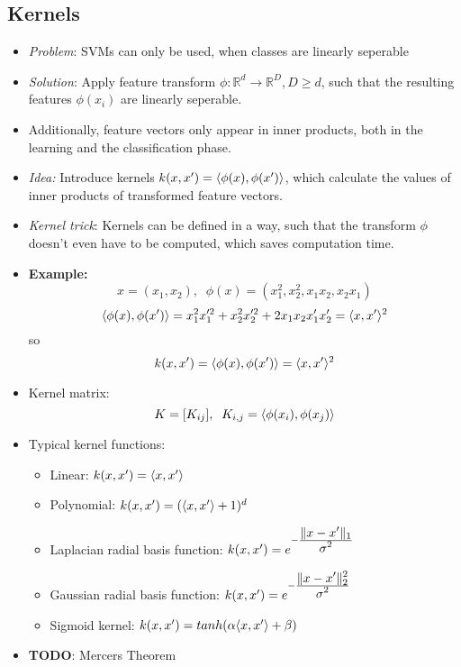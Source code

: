 \subsection*{Kernels}
\begin{itemize}
    \item
        \textit{Problem}: SVMs can only be used, when classes are linearly seperable
    \item
        \textit{Solution}: Apply feature transform $\phi: \mathbb{R}^{d} \rightarrow \mathbb{R}^{D}, D \geq d$, such that the resulting features $\phi(x_i)$ are linearly seperable.
    \item
        Additionally, feature vectors only appear in inner products, both in the learning and the classification phase.
    \item
        \textit{Idea:} Introduce kernels $k(x, x') = \langle\phi(x), \phi(x')\rangle$, which calculate the values of inner products of transformed feature vectors.
    \item
        \textit{Kernel trick}: Kernels can be defined in a way, such that the transform $\phi$ doesn't even have to be computed, which saves computation time.
    \item
        \textbf{Example:}
        $$x = (x_1, x_2),\;\; \phi(x) = (x_1^2, x_2^2, x_1 x_2, x_2 x_1)$$
        $$\langle\phi(x), \phi(x')\rangle = x_1^2 x_1 '^2 + x_2^2 x_2 '^2 + 2 x_1 x_2 x_1' x_2' = \langle x, x'\rangle^2$$
        so
        $$ k(x, x') = \langle\phi(x), \phi(x')\rangle = \langle x,x'\rangle^2$$
    \item
        Kernel matrix:
        $$ K = [K_{ij}], \; \; K_{i,j} = \langle\phi(x_i), \phi(x_j)\rangle$$
    \item
        Typical kernel functions:
        \begin{itemize}
            \item
                Linear: $k(x, x') = \langle x, x'\rangle$
            \item
                Polynomial: $k(x, x') = (\langle x,x'\rangle + 1)^d$
            \item
                Laplacian radial basis function: $k(x, x') = e^{-\frac{\displaystyle \lVert x-x'\rVert_1}{\displaystyle \sigma^2}}$
            \item
                Gaussian radial basis function: $k(x, x') = e^{-\frac{\displaystyle \lVert x-x'\rVert_2^2}{\displaystyle \sigma^2}}$
            \item
                Sigmoid kernel: $k(x, x') = tanh(\alpha \langle x, x'\rangle + \beta)$
        \end{itemize}
    \item
        \textbf{TODO}: Mercers Theorem

\end{itemize}
